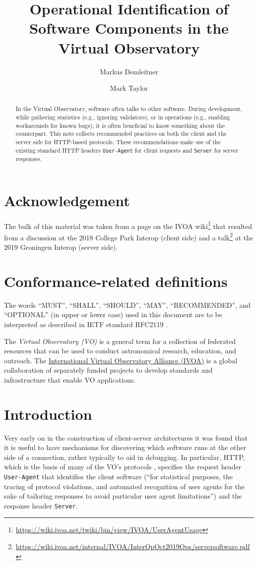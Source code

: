 \documentclass[11pt,a4paper]{ivoa}
\title{Operational Identification of Software Components in the Virtual
Observatory}
\author[https://wiki.ivoa.net/twiki/bin/view/IVOA/WebHome?topic=MarkusDemleitner]{Markus
Demleitner}
\author[https://wiki.ivoa.net/twiki/bin/view/IVOA/MarkusDemleitner?topic=MarkTaylor]{Mark
Taylor}
\newcommand{\headername}[1]{{\tt #1}}
\begin{document}
\begin{abstract}
In the Virtual Observatory, software often talks to other software.
During development, while gathering statistics (e.g., ignoring
validators), or in operations (e.g., enabling workarounds for known
bugs), it is often beneficial to know something about the
counterpart.  This note collects recommended practices on both the
client and the server side for HTTP-based protocols.
These recommendations make use of the existing standard HTTP headers
\headername{User-Agent} for client requests and
\headername{Server} for server responses.
\end{abstract}

\section*{Acknowledgement}

The bulk of this material was taken from a page on the IVOA
wiki\footnote{\url{https://wiki.ivoa.net/twiki/bin/view/IVOA/UserAgentUsage}}
that resulted from a discussion at the 2018 College Park Interop (client
side) and a
talk\footnote{\url{https://wiki.ivoa.net/internal/IVOA/InterOpOct2019Ops/serversoftware.pdf}}
at the 2019 Groningen Interop (server side).


\section*{Conformance-related definitions}

The words ``MUST'', ``SHALL'', ``SHOULD'', ``MAY'', ``RECOMMENDED'', and
``OPTIONAL'' (in upper or lower case) used in this document are to be
interpreted as described in IETF standard RFC2119 \citep{std:RFC2119}.

The \emph{Virtual Observatory (VO)} is a
general term for a collection of federated resources that can be used
to conduct astronomical research, education, and outreach.
The \href{http://www.ivoa.net}{International
Virtual Observatory Alliance (IVOA)} is a global
collaboration of separately funded projects to develop standards and
infrastructure that enable VO applications.


\section{Introduction}

Very early on in the construction of client-server architectures it was
found that it is useful to have mechanisms for 
discovering which software runs
at the other side of a connection, rather typically to aid in debugging.
In particular, HTTP, which is the basis of many of the VO's protocols
\citep{std:HTTP}, specifies the request header \headername{User-Agent} that
identifies the client software (``for statistical purposes, the tracing
of protocol violations, and automated recognition of user agents for the
sake of tailoring responses to avoid particular user agent
limitations'') and the response header \headername{Server}.
\end{document}
